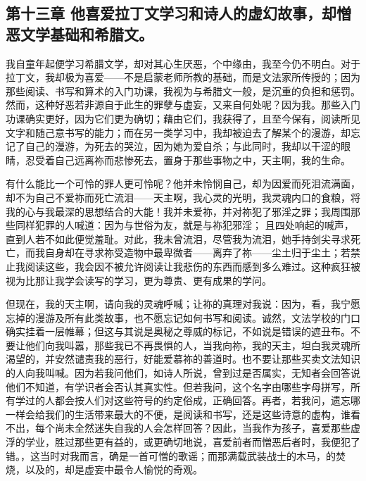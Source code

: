 
\subsection{第十三章 他喜爱拉丁文学习和诗人的虚幻故事，却憎恶文学基础和希腊文。}

我自童年起便学习希腊文学，却对其心生厌恶，个中缘由，我至今仍不明白。对于拉丁文，我却极为喜爱——不是启蒙老师所教的基础，而是文法家所传授的；因为那些阅读、书写和算术的入门功课，我视为与希腊文一般，是沉重的负担和惩罚。然而，这种好恶若非源自于此生的罪孽与虚妄，又来自何处呢？因为我。那些入门功课确实更好，因为它们更为确切；藉由它们，我获得了，且至今保有，阅读所见文字和随己意书写的能力；而在另一类学习中，我却被迫去了解某个的漫游，却忘记了自己的漫游，为死去的哭泣，因为她为爱自杀；与此同时，我却以干涩的眼睛，忍受着自己远离祢而悲惨死去，置身于那些事物之中，天主啊，我的生命。\par

有什么能比一个可怜的罪人更可怜呢？他并未怜悯自己，却为因爱而死泪流满面，却不为自己不爱祢而死亡流泪——天主啊，我心灵的光明，我灵魂内口的食粮，将我的心与我最深的思想结合的大能！我并未爱祢，并对祢犯了邪淫之罪；我周围那些同样犯罪的人喊道：因为与世俗为友，就是与祢犯邪淫； 且四处响起的喊声，直到人若不如此便觉羞耻。对此，我未曾流泪，尽管我为流泪，她手持剑尖寻求死亡，而我自身却在寻求祢受造物中最卑微者——离弃了祢——尘土归于尘土；若禁止我阅读这些，我会因不被允许阅读让我悲伤的东西而感到多么难过。这种疯狂被视为比那让我学会读写的学习，更为尊贵、更有成果的学问。\par

但现在，我的天主啊，请向我的灵魂呼喊；让祢的真理对我说：因为，看，我宁愿忘掉的漫游及所有此类故事，也不愿忘记如何书写和阅读。诚然，文法学校的门口确实挂着一层帷幕；但这与其说是奥秘之尊威的标记，不如说是错误的遮丑布。不要让他们向我叫嚣，那些我已不再畏惧的人，当我向祢，我的天主，坦白我灵魂所渴望的，并安然谴责我的恶行，好能爱慕祢的善道时。也不要让那些买卖文法知识的人向我叫喊。因为若我问他们，如诗人所说，曾到过是否属实，无知者会回答说他们不知道，有学识者会否认其真实性。但若我问，这个名字由哪些字母拼写，所有学过的人都会按人们对这些符号的约定俗成，正确回答。再者，若我问，遗忘哪一样会给我们的生活带来最大的不便，是阅读和书写，还是这些诗意的虚构，谁看不出，每个尚未全然迷失自我的人会怎样回答？因此，当我作为孩子，喜爱那些虚浮的学业，胜过那些更有益的，或更确切地说，喜爱前者而憎恶后者时，我便犯了错。，这当时对我而言，确是一首可憎的歌谣；而那满载武装战士的木马，的焚烧，以及的，却是虚妄中最令人愉悦的奇观。\par

